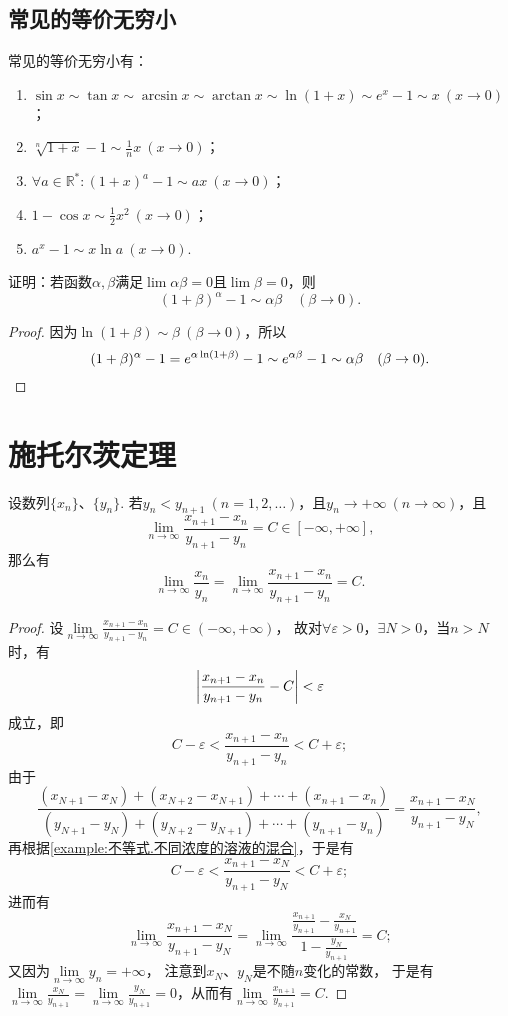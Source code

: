 \subsection{常见的等价无穷小}
常见的等价无穷小有：
\begin{enumerate}
\item \(\sin x \sim \tan x \sim \arcsin x \sim \arctan x \sim \ln(1+x) \sim e^x-1 \sim x\ (x\to0)\)；
\item \(\sqrt[n]{1+x} - 1 \sim \frac{1}{n} x\ (x\to0)\)；
\item \(\forall a\in\mathbb{R}^*: (1+x)^a-1 \sim ax\ (x\to0)\)；
\item \(1 - \cos x \sim \frac{1}{2} x^2\ (x\to0)\)；
\item \(a^x - 1 \sim x \ln a\ (x\to0)\).
\end{enumerate}

\begin{example}
证明：若函数\(\alpha,\beta\)满足\(\lim \alpha\beta = 0\)且\(\lim \beta = 0\)，则\[
(1+\beta)^{\alpha} - 1 \sim \alpha\beta \quad(\beta\to0).
\]
\begin{proof}
因为\(\ln(1+\beta) \sim \beta\ (\beta\to0)\)，所以\[
(1+\beta)^{\alpha} - 1
= e^{\alpha \ln(1+\beta)} - 1
\sim e^{\alpha\beta} - 1
\sim \alpha\beta
\quad(\beta\to0).
\qedhere
\]
\end{proof}
\end{example}

\section{施托尔茨定理}

\begin{theorem}[施托尔茨定理I]\label{theorem:极限.施托尔茨定理1}
设数列\(\{x_n\}\)、\(\{y_n\}\).
若\(y_n < y_{n+1}\ (n=1,2,\dotsc)\)，且\(y_n \to +\infty\ (n\to\infty)\)，且\[
\lim\limits_{n\to\infty} \frac{x_{n+1}-x_n}{y_{n+1}-y_n} = C\in[-\infty,+\infty],
\]那么有\[
\lim\limits_{n\to\infty} \frac{x_n}{y_n}
= \lim\limits_{n\to\infty} \frac{x_{n+1}-x_n}{y_{n+1}-y_n}
= C.
\]
\begin{proof}%
设\(\lim\limits_{n\to\infty} \frac{x_{n+1}-x_n}{y_{n+1}-y_n} = C\in(-\infty,+\infty)\)，%
故对\(\forall\varepsilon>0\)，\(\exists N>0\)，当\(n > N\)时，有\[
\abs{\frac{x_{n+1}-x_n}{y_{n+1}-y_n} - C} < \varepsilon
\]成立，即\[
C - \varepsilon < \frac{x_{n+1}-x_n}{y_{n+1}-y_n} < C + \varepsilon;
\]
由于\[
\frac{
(x_{N+1}-x_N)
+ (x_{N+2}-x_{N+1})
+ \dotsb
+ (x_{n+1}-x_n)
}{
(y_{N+1}-y_N)
+ (y_{N+2}-y_{N+1})
+ \dotsb
+ (y_{n+1}-y_n)
}
= \frac{x_{n+1}-x_N}{y_{n+1}-y_N},
\]再根据\cref{example:不等式.不同浓度的溶液的混合}，于是有\[
C - \varepsilon <
\frac{x_{n+1}-x_N}{y_{n+1}-y_N}
< C + \varepsilon;
\]进而有\[
\lim\limits_{n\to\infty} \frac{x_{n+1}-x_N}{y_{n+1}-y_N}
= \lim\limits_{n\to\infty} \frac{\frac{x_{n+1}}{y_{n+1}}-\frac{x_N}{y_{n+1}}}{1-\frac{y_N}{y_{n+1}}}
= C;
\]又因为\(\lim\limits_{n\to\infty} y_n = +\infty\)，%
注意到\(x_N\)、\(y_N\)是不随\(n\)变化的常数，%
于是有\(\lim\limits_{n\to\infty} \frac{x_N}{y_{n+1}}
= \lim\limits_{n\to\infty} \frac{y_N}{y_{n+1}}
= 0\)，从而有\(\lim\limits_{n\to\infty} \frac{x_{n+1}}{y_{n+1}} = C\).
\end{proof}
\end{theorem}

